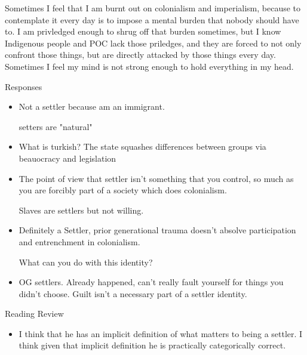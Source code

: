 \documentclass{report}
\begin{document}
\begin{description}
\begin{mdframed}
            Sometimes I feel that I am burnt out on colonialism and
            imperialism, because to contemplate it every day is to
            impose a mental burden that nobody should have to. I am privledged
            enough to shrug off that burden sometimes, but I know Indigenous
            people and POC lack those priledges, and they are forced to not only
            confront those things, but are directly attacked by those things every day.
            Sometimes I feel my mind is not strong enough to hold everything in my
            head.
        \end{mdframed}

    \item {\large Responses}
        \begin{mdframed}
            \begin{itemize}
                \item Not a settler because am an immigrant.

                    setters are "natural"

                \item What is turkish? The state squashes differences
                    between groups via beauocracy and legislation 

                \item The point of view that settler isn't something
                    that you control, so much as you are forcibly
                    part of a society which does colonialism.

                    Slaves are settlers but not willing.

                \item Definitely a Settler, prior generational trauma doesn't absolve
                    participation and entrenchment in colonialism.

                    What can you do with this identity?

                \item OG settlers. Already happened, can't really fault
                    yourself for things you didn't choose. Guilt isn't
                    a necessary part of a settler identity.
            \end{itemize}
        \end{mdframed}

    \item Reading Review
        \begin{mdframed}
            \begin{itemize}
                \item I think that he has an implicit definition of what matters to
                    being a settler. I think given that implicit definition he is
                    practically categorically correct.


\end{itemize}
\end{mdframed}
\end{description}
\end{document}
